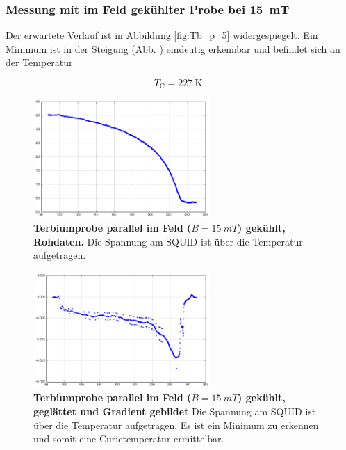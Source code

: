 \documentclass[a4paper,ngerman]{scrartcl}
\begin{document}
\subsubsection*{Messung mit im Feld gekühlter Probe bei \SI{15}{mT}}

Der erwartete Verlauf ist in Abbildung \ref{fig:Tb_p_5} widergespiegelt.
Ein Minimum ist in der Steigung (Abb. ) eindeutig erkennbar und befindet sich an der Temperatur

\begin{equation}
T_{\mathrm{C}} = \SI{227}{\K} ~.
\end{equation}

\begin{figure}
\centering
\includegraphics[width=0.6\textwidth]{abbildungen/Tb_p_15.png}
\caption[Terbiumprobe parallel bei 15mT]{\textbf{Terbiumprobe parallel im Feld ($B = \SI{15}{mT}$) gekühlt, Rohdaten.} 
Die Spannung am SQUID ist über die Temperatur aufgetragen. }
\label{fig:Tb_p_10}
\end{figure}

\begin{figure}
\centering
\includegraphics[width=0.6\textwidth]{abbildungen/Tb_p_15_grad.png}
\caption[Terbiumprobe parallel bei 15mT]{\textbf{Terbiumprobe parallel im Feld ($B = \SI{15}{mT}$) gekühlt, geglättet und Gradient gebildet} 
Die Spannung am SQUID ist über die Temperatur aufgetragen. 
Es ist ein Minimum zu erkennen und somit eine Curietemperatur ermittelbar.}
\label{fig:Tb_p_10_grad}
\end{figure}
\end{document}
